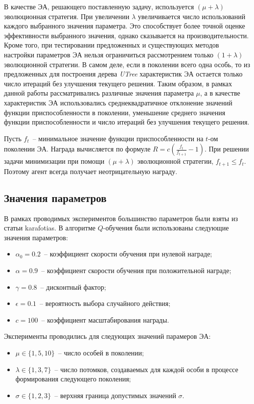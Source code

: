 В качестве ЭА, решающего поставленную задачу, используется $(\mu + \lambda)$ эволюционная стратегия. При увеличении $\lambda$ увеличивается число использований каждого выбранного значения параметра. Это способствует более точной оценке эффективности выбранного значения, однако сказывается на производительности. Кроме того, при тестировании предложенных и существующих методов настройки параметров ЭА нельзя ограничиться рассмотрением только $(1+\lambda)$ эволюционной стратегии. В самом деле, если в поколении всего одна особь, то из предложенных для построения дерева \textit{UTree} характеристик ЭА остается только число итераций без улучшения текущего решения. Таким образом, в рамках данной работы рассматривались различные значения параметра $\mu$, а в качестве характеристик ЭА использовались среднеквадратичное отклонение значений функции приспособленности в поколении, уменьшение среднего значения функции приспособленности и число итераций без улучшения текущего решения.

Пусть $f_t$~-- минимальное значение функции приспособленности на $t$-ом поколении ЭА. Награда вычисляется по формуле $R = c(\frac{f_t}{f_{t + 1}} - 1)$. При решении задачи минимизации при помощи $(\mu + \lambda)$ эволюционной стратегии, $f_{t + 1} \le f_t$. Поэтому агент всегда получает неотрицательную награду.

\subsection{Значения параметров}

В рамках проводимых экспериментов большинство параметров были взяты из статьи {karafotias}. В алгоритме $Q$-обучения были использованы следующие значения параметров:
\begin{itemize}
 \item $\alpha_0 = 0.2$~-- коэффициент скорости обучения при нулевой награде;
 \item $\alpha = 0.9$~-- коэффициент скорости обучения при положительной награде;
 \item $\gamma = 0.8$~-- дисконтный фактор;
 \item $\epsilon = 0.1$~-- вероятность выбора случайного действия;
 \item $c = 100$~-- коэффициент масштабирования награды.
\end{itemize}

Эксперименты проводились для следующих значений парамеров ЭА:
\begin{itemize}
 \item $\mu \in \{1, 5, 10\}$~-- число особей в поколении;
 \item $\lambda \in \{1, 3, 7\}$~-- число потомков, создаваемых для каждой особи в процессе формирования следующего поколения;
 \item $\sigma \in \{1, 2, 3\}$~-- верхняя граница допустимых значений $\sigma$.
\end{itemize}

